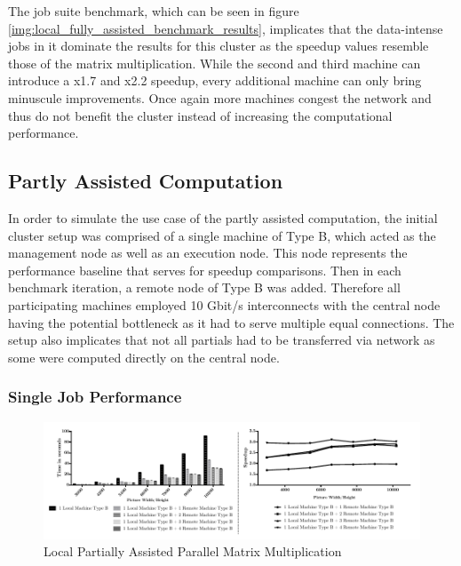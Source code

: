 The job suite benchmark, which can be seen in figure \ref{img:local_fully_assisted_benchmark_results}, implicates that the data-intense jobs in it dominate the results for this cluster as the speedup values resemble those of the matrix multiplication. While the second and third machine can introduce a x1.7 and x2.2 speedup, every additional machine can only bring minuscule improvements. Once again more machines congest the network and thus do not benefit the cluster instead of increasing the computational performance.

\subsection{Partly Assisted Computation}

In order to simulate the use case of the partly assisted computation, the initial cluster setup was comprised of a single machine of Type B, which acted as the management node as well as an execution node. This node represents the performance baseline that serves for speedup comparisons. Then in each benchmark iteration, a remote node of Type B was added. Therefore all participating machines employed 10 Gbit/s interconnects with the central node having the potential bottleneck as it had to serve multiple equal connections. The setup also implicates that not all partials had to be transferred via network as some were computed directly on the central node.

\subsubsection*{Single Job Performance}
\label{single_job_performance}

\begin{figure}[!htb]

	\includegraphics[width=1.0\textwidth]{images/local_partially_assisted_matrix.pdf}
	\centering
	\caption{Local Partially Assisted Parallel Matrix Multiplication}
	\label{img:parallel_matrix}
\end{figure}

